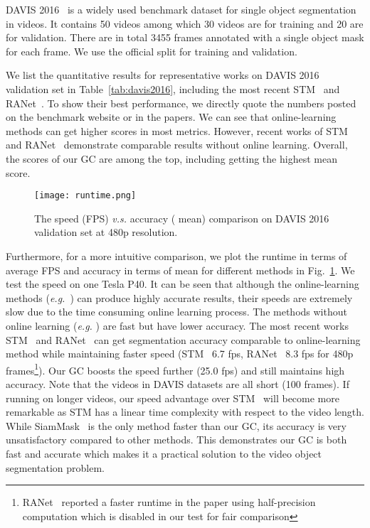 \documentclass[runningheads]{llncs}
\begin{document}
DAVIS 2016~\cite{davis2016} is a widely used benchmark dataset for single object segmentation in videos. It contains 50 videos among which 30 videos are for training and 20 are for validation. There are in total 3455 frames annotated with a single object mask for each frame. We use the official split for training and validation.

We list the quantitative results for representative works on DAVIS 2016 validation set in Table~\ref{tab:davis2016}, including the most recent STM~\cite{stm} and RANet~\cite{ranet}. To show their best performance, we directly quote the numbers posted on the benchmark website or in the papers. We can see that online-learning methods can get higher scores in most metrics. However, recent works of STM~\cite{stm} and RANet~\cite{ranet} demonstrate comparable results without online learning. Overall, the scores of our GC are among the top, including getting the highest  mean score.


\begin{figure}[tb]
    \centering
    \texttt{[image: runtime.png]}
    \caption{The speed (FPS) \textit{v.s.} accuracy ( mean) comparison on DAVIS 2016 validation set at 480p resolution.}
    \label{fig:runtime}
\end{figure}

Furthermore, for a more intuitive comparison, we plot the runtime in terms of average FPS and accuracy in terms of  mean for different methods in Fig.~\ref{fig:runtime}. We test the speed on one Tesla P40. It can be seen that although the online-learning methods (\textit{e.g.}~\cite{cinm,premvos,osvoss}) can produce highly accurate results, their speeds are extremely slow due to the time consuming online learning process. The methods without online learning (\textit{e.g.} \cite{pml,rgmp,osmn}) are fast but have lower accuracy. The most recent works STM~\cite{stm} and RANet~\cite{ranet} can get segmentation accuracy comparable to online-learning method while maintaining faster speed (STM~\cite{stm} 6.7 fps, RANet~\cite{ranet} 8.3 fps for 480p frames\footnote{RANet~\cite{ranet} reported a faster runtime in the paper using half-precision computation which is disabled in our test for fair comparison}). Our GC boosts the speed further (25.0 fps) and still maintains high accuracy. Note that the videos in DAVIS datasets are all short (100 frames). If running on longer videos, our speed advantage over STM~\cite{stm} will become more remarkable as STM has a linear time complexity with respect to the video length. While SiamMask~\cite{siammask} is the only method faster than our GC, its accuracy is very unsatisfactory compared to other methods. This demonstrates our GC is both fast and accurate which makes it a practical solution to the video object segmentation problem.
\end{document}
